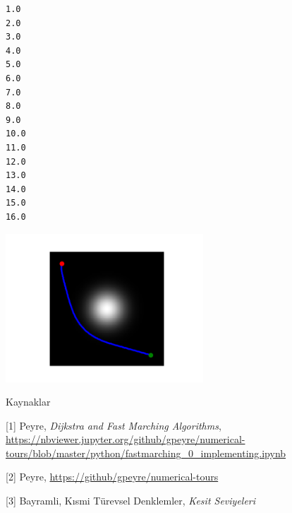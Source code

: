 \documentclass[12pt,fleqn]{article}\usepackage{../../common}
\begin{document}
\begin{verbatim}
1.0
2.0
3.0
4.0
5.0
6.0
7.0
8.0
9.0
10.0
11.0
12.0
13.0
14.0
15.0
16.0
\end{verbatim}

\includegraphics[width=20em]{out-760.png}




Kaynaklar

[1] Peyre, {\em Dijkstra and Fast Marching Algorithms},
\url{https://nbviewer.jupyter.org/github/gpeyre/numerical-tours/blob/master/python/fastmarching_0_implementing.ipynb}

[2] Peyre, \url{https://github/gpeyre/numerical-tours}

[3] Bayramli, Kısmi Türevsel Denklemler, {\em Kesit Seviyeleri}
\end{document}
